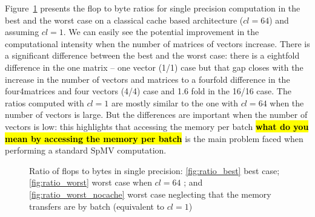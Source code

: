 \documentclass[10pt,conference,compsocconf]{IEEEtran}
\newcommand{\todo}[1]{{\color{red}\textbf{\hl{#1}}\xspace}}
\begin{document}
Figure~\ref{fig:ratio_bytes_flops} presents the flop to byte ratios
for single precision computation in the best and the worst case on a
classical cache based architecture ($cl = 64$) and assuming $cl=1$. We
can easily see the potential improvement in the computational
intensity when the number of matrices of vectors increase. There is a
significant difference between the best and the worst case: there is a
eightfold difference in the one matrix -- one vector (1/1) case but that gap closes
with the increase in the number of vectors and matrices to a fourfold
difference in the four4matrices and four vectors (4/4) case and 1.6 fold in the 
16/16 case. 
The ratios computed with $cl = 1$ are mostly
similar to the one with $cl=64$ when the number of vectors is
large. But the differences are important when the number of vectors is
low: this highlights that accessing the memory per batch \todo{what do you mean by 
accessing the memory per batch} is the main
problem faced when performing a standard SpMV computation.

\begin{figure}
  \centering
  
  \caption{Ratio of flops to bytes in single precision:  
    \ref{fig:ratio_best} best case; \ref{fig:ratio_worst} worst case when $cl=64$ 
    ; and \ref{fig:ratio_worst_nocache} worst case neglecting that the
    memory transfers are by batch (equivalent to $cl = 1$)}
  \label{fig:ratio_bytes_flops}
\end{figure}
\end{document}
